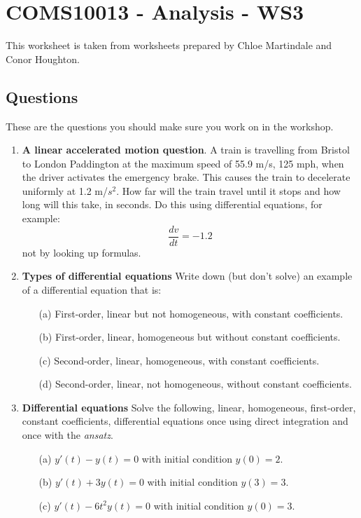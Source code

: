\documentclass[11pt,a4paper]{scrartcl}
\begin{document}
\section*{COMS10013 - Analysis - WS3}

This worksheet is taken from worksheets prepared by Chloe Martindale and Conor Houghton.

\subsection*{Questions}

These are the questions you should make sure you work on in the workshop.

\begin{enumerate}

\item \textbf{A linear accelerated motion question}. A train is travelling from Bristol to London Paddington at the maximum speed of 55.9 m/s, 125 mph, when the driver activates the emergency brake. This causes the train to decelerate uniformly at 1.2 m/$s^2$. How far will the train travel until it stops and how long will this take, in seconds. Do this using differential equations, for example:
  \begin{equation}
    \frac{dv}{dt}=-1.2
  \end{equation}
  not by looking up formulas.

\item \textbf{Types of differential equations}
  Write down (but don't solve) an example of a differential equation that is:
  \begin{itemize}
  \item[(a)] First-order, linear but not homogeneous, with constant coefficients.
  \item[(b)] First-order, linear, homogeneous but without constant coefficients.
  \item[(c)] Second-order, linear, homogeneous, with constant coefficients.
  \item[(d)] Second-order, linear, not homogeneous, without constant coefficients.
  \end{itemize}
	
\item \textbf{Differential equations} Solve the following, linear,
  homogeneous, first-order, constant coefficients, differential
  equations once using direct integration and once with the
  \emph{ansatz}.
	\begin{itemize}
		\item[(a)] $y'(t) - y(t) = 0$ with initial condition $y(0) = 2$.
		\item[(b)] $y'(t) + 3y(t) = 0$ with initial condition $y(3) = 3$.
		\item[(c)] $y'(t) - 6t^2y(t) = 0$ with initial condition $y(0) = 3$.
	\end{itemize}



\end{enumerate}
\end{document}
